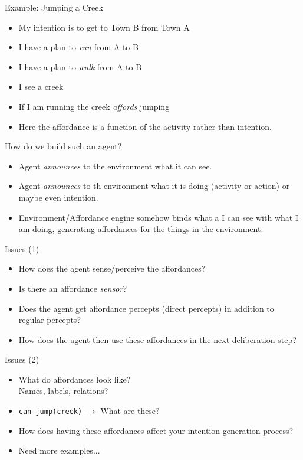 \documentclass[aspectratio=1610,xcolor=dvipsnames,t]{beamer}
\begin{document}
\begin{frame}{Example: Jumping a Creek} 
    \begin{itemize} 
        \item My intention is to get to Town B from Town A
        \item I have a plan to \emph{run} from A to B
        \item I have a plan to \emph{walk} from A to B
        \item I see a creek
        \item If I am running the creek \emph{affords} jumping
        \item Here the affordance is a function of the activity rather than
            intention.
    \end{itemize} 
\end{frame} 

\begin{frame}{How do we build such an agent?}
    \begin{itemize} 
        \item Agent \emph{announces} to the environment what it can see.
        \item Agent \emph{announces} to th environment what it is doing
            (activity or action) or maybe even intention.
        \item Environment/Affordance engine somehow binds what a I can see with
            what I am doing, generating affordances for the things in the
            environment.
    \end{itemize} 
\end{frame} 

\begin{frame}{Issues (1)}
    \begin{itemize} 
        \item How does the agent sense/perceive the affordances?
        \item Is there an affordance \emph{sensor}?
        \item Does the agent get affordance percepts (direct percepts) in
            addition to regular percepts?
        \item How does the agent then use these affordances in the next
            deliberation step?
    \end{itemize} 
\end{frame} 

\begin{frame}{Issues (2)}
    \begin{itemize} 
        \item What do affordances look like? \\ Names, labels, relations?
        \item \texttt{can-jump(creek)} $\rightarrow$ What are these? 
        \item How does having these affordances affect your intention
            generation process?
        \item Need more examples...
    \end{itemize} 
\end{frame} 
\end{document}

